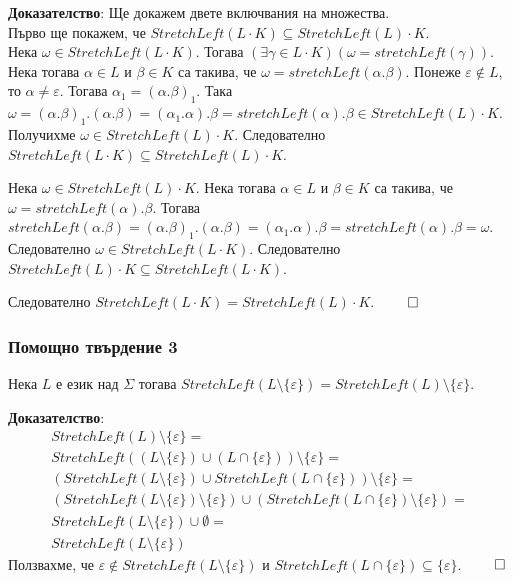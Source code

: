 \documentclass[12pt]{article}
\begin{document}
\vspace*{5mm}

\textbf{Доказателство}: Ще докажем двете включвания на множества. \\
Първо ще покажем, че \(StretchLeft(L \cdot K) \subseteq StretchLeft(L) \cdot K\). \\
Нека \(\omega \in StretchLeft(L \cdot K)\). Тогава \((\exists \gamma \in L \cdot K)(\omega = stretchLeft(\gamma))\).
Нека тогава \(\alpha \in L\) и \(\beta \in K\) са такива, че \(\omega = stretchLeft(\alpha . \beta)\).
Понеже \(\varepsilon \notin L\), то \(\alpha \neq \varepsilon\). Тогава \(\alpha_1 = (\alpha . \beta)_1\).
Така \(\omega = (\alpha.\beta)_1.(\alpha . \beta) = (\alpha_1 . \alpha) . \beta = stretchLeft(\alpha).\beta \in StretchLeft(L) \cdot K \). Получихме \(\omega \in StretchLeft(L) \cdot K\).
Следователно \(StretchLeft(L \cdot K) \subseteq StretchLeft(L) \cdot K\). \\
\vspace*{3mm}

\par Нека \(\omega \in StretchLeft(L) \cdot K\). Нека тогава \(\alpha \in L\) и \(\beta \in K\) са такива, че \(\omega = stretchLeft(\alpha) . \beta\). Тогава \(stretchLeft(\alpha . \beta) = (\alpha . \beta)_1 . (\alpha.\beta) = (\alpha_1 .\alpha) . \beta = stretchLeft(\alpha) . \beta = \omega\). Следователно \(\omega \in StretchLeft(L \cdot K)\).
Следователно \(StretchLeft(L) \cdot K \subseteq StretchLeft(L \cdot K)\). \\

\vspace*{3mm}

Следователно \(StretchLeft(L \cdot K) = StretchLeft(L) \cdot K\). \(\qed\)

\subsubsection*{Помощно твърдение 3}
Нека \(L\) е език над \(\Sigma\) тогава \(StretchLeft(L \setminus \{\varepsilon\}) = StretchLeft(L) \setminus \{\varepsilon\}\). \\

\vspace*{5mm}

\textbf{Доказателство}:
\begin{align*}
    StretchLeft(L) \setminus \{\varepsilon\} = \\
    StretchLeft((L \setminus \{\varepsilon\}) \cup (L \cap \{ \varepsilon \})) \setminus \{\varepsilon\} = \\
    (StretchLeft(L \setminus \{\varepsilon\}) \cup StretchLeft(L \cap \{ \varepsilon \})) \setminus \{\varepsilon\} = \\
    (StretchLeft(L \setminus \{\varepsilon\}) \setminus \{\varepsilon\}) \cup (StretchLeft(L \cap \{ \varepsilon \}) \setminus \{\varepsilon\} ) = \\
    StretchLeft(L \setminus \{\varepsilon\}) \cup \emptyset = \\
    StretchLeft(L \setminus \{\varepsilon\})
\end{align*}
Ползвахме, че \(\varepsilon \notin StretchLeft(L \setminus \{\varepsilon\})\) и \(StretchLeft(L \cap \{ \varepsilon \}) \subseteq \{\varepsilon\}\). \(\qed\)
\end{document}
